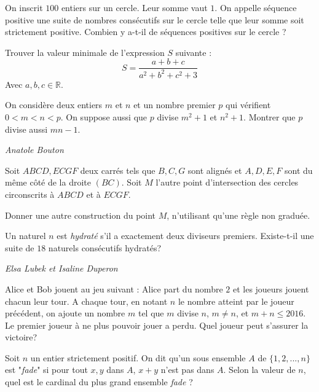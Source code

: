 \begin{exo}{}
On inscrit $100$ entiers sur un cercle. Leur somme vaut $1$. On appelle séquence positive une suite de nombres consécutifs sur le cercle telle que leur somme soit strictement positive. Combien y a-t-il de séquences positives sur le cercle ?
\end{exo}

\begin{exo}{}
Trouver la valeur minimale de l'expression $S$ suivante :
$$S=\dfrac{a+b+c}{a^2+b^2+c^2+3}$$
Avec $a,b,c\in \mathbb{R}$.
\end{exo}

\begin{exo}{}
On considère deux entiers $m$ et $n$ et un nombre premier $p$ qui vérifient $0<m<n<p$. On suppose aussi que $p$ divise $m^2+1$ et $n^2+1$. Montrer que $p$ divise aussi $mn-1$.

\medskip
\textit{Anatole Bouton}
\end{exo}

\begin{exo}{}
Soit $ABCD,ECGF$ deux carrés tels que $B,C,G$ sont alignés et $A,D,E,F$ sont
du même côté de la droite $(BC)$. Soit $M$ l'autre point d'intersection des cercles
circonscrits à $ABCD$ et à $ECGF$.

Donner une autre construction du point $M$, n'utilisant qu'une règle non graduée.
\end{exo}



\begin{exo}{}
Un naturel $n$ est \emph{hydraté} s'il a exactement deux diviseurs premiers. Existe-t-il une suite de $18$ naturels consécutifs hydratés?

\medskip
\textit{Elsa Lubek et Isaline Duperon}
\end{exo}


\begin{exo}{}
Alice et Bob jouent au jeu suivant :
Alice part du nombre $2$ et les joueurs jouent chacun leur tour.
A chaque tour, en notant $n$ le nombre atteint par le joueur précédent, on ajoute un nombre $m$ tel que $m$ divise $n$, $m \neq n$, et $m+n \leq 2016$.
Le premier joueur à ne plus pouvoir jouer a perdu.
Quel joueur peut s'assurer la victoire?
\end{exo}


\begin{exo}{}
Soit $n$ un entier strictement positif. On dit qu'un sous ensemble $A$ de $\{1,2,...,n\}$ est "\textit{fade}" si pour tout $x,y$ dans $A$, $x+y$ n'est pas dans $A$. Selon la valeur de $n$, quel est le cardinal du plus grand ensemble \textit{fade} ?
\end{exo}


